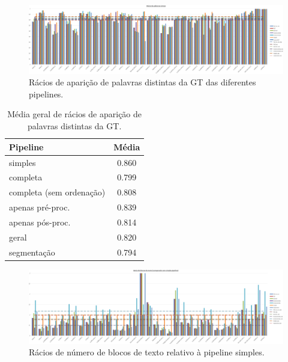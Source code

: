 \begin{figure}[H]
	\centering
	\hspace*{-2cm}
	\includegraphics[width=1.1\textwidth]{images/resultados/graph_gt_unique_word_hit_ratio.png}
	\caption{Rácios de aparição de palavras distintas da GT das diferentes pipelines.}
	\label{fig:graph_gt_unique_word_hit_ratio}
\end{figure}


\begin{table}[H]
	\centering
	\begin{tabular}{|l|c|}
		\hline
		\textbf{Pipeline} & \textbf{Média} \\ \hline
		simples & 0.860 				   \\ \hline
		completa & 0.799 				   \\ \hline
		completa (sem ordenação) & 0.808   \\ \hline
		apenas pré-proc. & 0.839 		   \\ \hline
		apenas pós-proc. & 0.814 		   \\ \hline
		geral & 0.820 					   \\ \hline
		segmentação & 0.794 			   \\ \hline
	\end{tabular}
	\caption{Média geral de rácios de aparição de palavras distintas da GT.}
\end{table}


\begin{figure}[H]
	\centering
	\hspace*{-2cm}
	\includegraphics[width=1.1\textwidth]{images/resultados/graph_text_block_ratio.png}
	\caption{Rácios de número de blocos de texto relativo à pipeline simples.}
	\label{fig:graph_text_block_ratio}
\end{figure}


